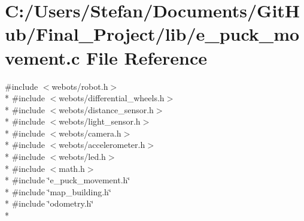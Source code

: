 \section{C\-:/\-Users/\-Stefan/\-Documents/\-Git\-Hub/\-Final\-\_\-\-Project/lib/e\-\_\-puck\-\_\-movement.c File Reference}
\label{e__puck__movement_8c}
{\ttfamily \#include $<$webots/robot.\-h$>$}\\*
{\ttfamily \#include $<$webots/differential\-\_\-wheels.\-h$>$}\\*
{\ttfamily \#include $<$webots/distance\-\_\-sensor.\-h$>$}\\*
{\ttfamily \#include $<$webots/light\-\_\-sensor.\-h$>$}\\*
{\ttfamily \#include $<$webots/camera.\-h$>$}\\*
{\ttfamily \#include $<$webots/accelerometer.\-h$>$}\\*
{\ttfamily \#include $<$webots/led.\-h$>$}\\*
{\ttfamily \#include $<$math.\-h$>$}\\*
{\ttfamily \#include \char`\"{}e\-\_\-puck\-\_\-movement.\-h\char`\"{}}\\*
{\ttfamily \#include \char`\"{}map\-\_\-building.\-h\char`\"{}}\\*
{\ttfamily \#include \char`\"{}odometry.\-h\char`\"{}}\\*
